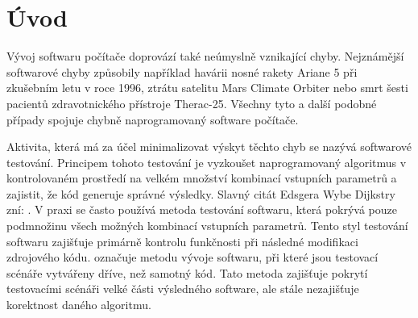 \chapter*{Úvod}
\setcounter{page}{1}



Vývoj softwaru počítače doprovází také neúmyslně vznikající chyby. Nejznámější softwarové chyby způsobily například havárii nosné rakety Ariane 5 při zkušebním letu v roce 1996, ztrátu satelitu Mars Climate Orbiter nebo smrt šesti pacientů zdravotnického přístroje Therac-25. Všechny tyto a další podobné případy spojuje chybně naprogramovaný software počítače.

Aktivita, která má za účel minimalizovat výskyt těchto chyb se nazývá softwarové testování. Principem tohoto testování je vyzkoušet naprogramovaný algoritmus v kontrolovaném prostředí na velkém množství kombinací vstupních parametrů a zajistit, že kód generuje správné výsledky. Slavný citát Edsgera Wybe Dijkstry zní: . V praxi se často používá metoda testování softwaru, která pokrývá pouze podmnožinu všech možných kombinací vstupních parametrů. Tento styl testování softwaru zajišťuje primárně kontrolu funkčnosti při následné modifikaci zdrojového kódu.  označuje metodu vývoje softwaru, při které jsou  testovací scénáře vytvářeny dříve, než samotný kód. Tato metoda zajišťuje pokrytí testovacími scénáři velké části výsledného software, ale stále nezajišťuje korektnost daného algoritmu. \cite{TDD2002}

